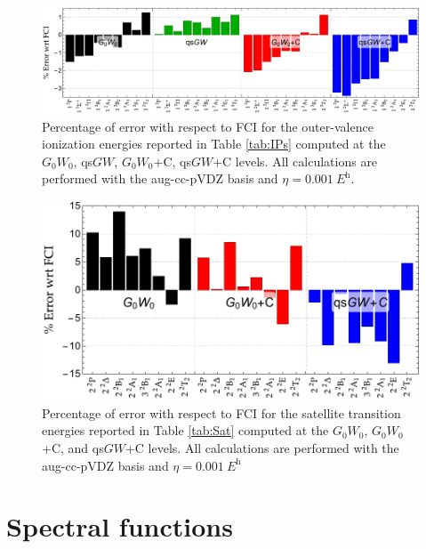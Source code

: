 \documentclass[aip,jcp,reprint,noshowkeys,superscriptaddress]{revtex4-2}
\begin{document}
\begin{figure}
	\includegraphics[width=\linewidth]{IPs}
\caption{
Percentage of error with respect to FCI for the outer-valence ionization energies reported in Table \ref{tab:IPs} computed at the $G_0W_0$, qs$GW$, $G_0W_0$+C, qs$GW$+C levels. All calculations are performed with the aug-cc-pVDZ basis and $\eta = \SI{0.001}{\hartree}$.}
\label{fig:IPs}
\end{figure}

\begin{figure}
	\includegraphics[width=\linewidth]{Sat}
\caption{
Percentage of error with respect to FCI for the satellite transition energies reported in Table \ref{tab:Sat} computed at the $G_0W_0$, $G_0W_0$+C, and qs$GW$+C levels. All calculations are performed with the aug-cc-pVDZ basis and $\eta = \SI{0.001}{\hartree}$}
\label{fig:Sat}
\end{figure}

\section{Spectral functions}
\label{sec:res}
\end{document}
